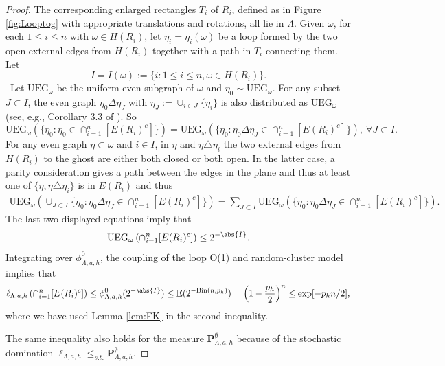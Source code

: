 \documentclass[article,12pt,reqno]{amsart}
\begin{document}
\begin{proof}
The corresponding enlarged rectangles $T_i$ of $R_i$, defined as in Figure \ref{fig:Looptog} with appropriate translations and rotations, all lie in $\Lambda$. Given $\omega$, for each $1\leq i \leq n$ with $\omega \in H(R_i)$,  let $\eta_i=\eta_i(\omega)$ be a loop formed by the two open external edges from $H(R_i)$ together with a path in $T_i$ connecting them. Let 
\[I=I(\omega):=\{i: 1\leq i \leq n, \omega \in H(R_i) \}.\]\
Let $\text{UEG}_{\omega}$ be the uniform even subgraph of $\omega$ and $\eta_0 \sim \text{UEG}_{\omega}$. For any subset $J \subset I$, the even graph $\eta_0 \Delta \eta_J$ with $\eta_J:=\cup_{i\in J}\{\eta_i\}$ is also distributed as $\text{UEG}_{\omega}$ (see, e.g., Corollary 3.3 of \cite{ADCTW19}). So
\[\text{UEG}_{\omega}(\{\eta_0: \eta_0 \in \cap_{i=1}^n[E(R_i)^c]\})=\text{UEG}_{\omega}(\{\eta_0: \eta_0 \Delta \eta_J \in \cap_{i=1}^n[E(R_i)^c]\}),\ \forall J\subset I.\]
For any even graph $\eta \subset \omega$ and $i \in I$, in $\eta$ and $\eta \triangle \eta_i$ the two external edges from $H(R_i)$ to the ghost are either both closed or both open. In the latter case, a parity consideration gives a path between the edges in the plane and thus at least one of $\{\eta, \eta \triangle \eta_i\}$ is in $E(R_i)$ and thus
\begin{align*}
\text{UEG}_{\omega}(\cup_{J \subset I}\{\eta_0: \eta_0 \Delta \eta_J \in \cap_{i=1}^n[E(R_i)^c]\})=\sum_{J \subset I}\text{UEG}_{\omega}(\{\eta_0: \eta_0 \Delta \eta_J \in \cap_{i=1}^n[E(R_i)^c]\}). %
\end{align*}
The last two displayed equations imply that
$$
\operatorname{UEG}_\omega \left(\cap_{i=1}^n[E(R_i)^c] \right)  \leq 2^{ - \abs{I}}.
$$
Integrating over $\phi^0_{\Lambda,a,h}$, the coupling of the loop O(1) and random-cluster model implies that
$$
\ell_{\Lambda,a,h}\left( \cap_{i=1}^n[E(R_i)^c] \right) \leq \phi^0_{\Lambda,a,h}(2^{ - \abs{I}}) \leq \mathbb{E}(2^{ -\text{Bin}(n,p_h)}) = \left(1-\frac{p_h}{2}\right)^n \leq  \exp[-p_h n/2],
$$
where we have used Lemma \ref{lem:FK} in the second inequality.

The same inequality also holds for the measure $\mathbf{P}_{\Lambda,a,h}^{\emptyset}$ because of the stochastic domination $\ell_{\Lambda,a,h} \leq_{s.t.} \mathbf{P}_{\Lambda,a,h}^{\emptyset}$.
\end{proof}
\end{document}

